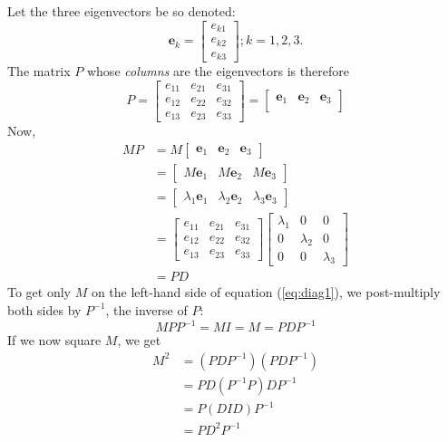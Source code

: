 \documentclass[
  12pt,
  a4paper,
]{article}
\begin{document}
Let the three eigenvectors be so denoted: \[
\boldsymbol{e}_{k} = \begin{bmatrix}
e_{k1}\\
e_{k2}\\
e_{k3}
\end{bmatrix} ; k = 1, 2, 3.
\] The matrix \(P\) whose \emph{columns} are the eigenvectors is
therefore \[
P = \begin{bmatrix}
e_{11} & e_{21} & e_{31}\\
e_{12} & e_{22} & e_{32}\\
e_{13} & e_{23} & e_{33}
\end{bmatrix}
= \begin{bmatrix}
\boldsymbol{e}_{1} & \boldsymbol{e}_{2} & \boldsymbol{e}_{3}\\
\end{bmatrix}
\] Now, \begin{equation}
\begin{aligned}
MP &= M\begin{bmatrix}
\boldsymbol{e}_{1} & \boldsymbol{e}_{2} & \boldsymbol{e}_{3}
\end{bmatrix}\\
&= \begin{bmatrix}
M\boldsymbol{e}_{1} & M\boldsymbol{e}_{2} & M\boldsymbol{e}_{3}
\end{bmatrix}\\
&= \begin{bmatrix}
\lambda_{1}\boldsymbol{e}_{1} & \lambda_{2}\boldsymbol{e}_{2} & \lambda_{3}\boldsymbol{e}_{3}
\end{bmatrix}\\
&= \begin{bmatrix}
e_{11} & e_{21} & e_{31}\\
e_{12} & e_{22} & e_{32}\\
e_{13} & e_{23} & e_{33}
\end{bmatrix}
\begin{bmatrix}
\lambda_{1} & 0 & 0\\
0 & \lambda_{2} & 0\\
0 & 0 & \lambda_{3}
\end{bmatrix}\\
&= PD
\end{aligned}
\label{eq:diag1}\end{equation} To get only \(M\) on the left-hand side
of equation (\ref{eq:diag1}), we post-multiply both sides by \(P^{-1}\),
the inverse of \(P\): \begin{equation}
MPP^{-1} = MI = M = PDP^{-1}
\label{eq:eigendecomp}\end{equation} If we now square \(M\), we get
\begin{equation}
\begin{aligned}
M^{2} &= (PDP^{-1})(PDP^{-1})\\
&= PD(P^{-1}P)DP^{-1}\\
&= P(DID)P^{-1}\\
&= PD^{2}P^{-1}
\end{aligned}
\label{eq:D-squared}\end{equation}
\end{document}
